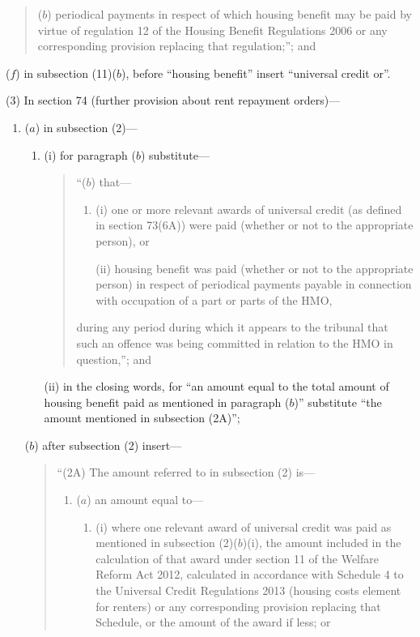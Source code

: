 \documentclass[12pt,a4paper]{article}
\begin{document}
\begin{enumerate}
\begin{enumerate}
\begin{quotation}
\begin{enumerate}
($b$) 
periodical payments in respect of which housing benefit may be paid by virtue of regulation 12 of the Housing Benefit Regulations 2006 or any corresponding provision replacing that regulation;”; and
\end{enumerate}
\end{quotation}
\end{enumerate}

($f$) in subsection (11)($b$), before “housing benefit” insert “universal credit or”.
\end{enumerate}

(3) In section 74 (further provision about rent repayment orders)—
\begin{enumerate}\item[]
($a$) in subsection (2)—
\begin{enumerate}\item[]
(i) for paragraph ($b$)  substitute—
\begin{quotation}
“($b$) that—
\begin{enumerate}\item[]
(i) one or more relevant awards of universal credit (as defined in section 73(6A)) were paid (whether or not to the appropriate person), or

(ii) housing benefit was paid (whether or not to the appropriate person) in respect of periodical payments payable in connection with occupation of a part or parts of the HMO,
\end{enumerate}
during any period during which it appears to the tribunal that such an offence was being committed in relation to the HMO in question,”; and
\end{quotation}

(ii) in the closing words, for “an amount equal to the total amount of housing benefit paid as mentioned in paragraph ($b$)” substitute “the amount mentioned in subsection (2A)”;
\end{enumerate}

($b$) after subsection (2) insert—
\begin{quotation}
“(2A) The amount referred to in subsection (2) is—
\begin{enumerate}\item[]
($a$) an amount equal to—
\begin{enumerate}\item[]
(i) where one relevant award of universal credit was paid as mentioned in subsection (2)($b$)(i), the amount included in the calculation of that award under section 11 of the Welfare Reform Act 2012, calculated in accordance with Schedule 4 to the Universal Credit Regulations 2013 (housing costs element for renters) or any corresponding provision replacing that Schedule, or the amount of the award if less; or


\end{enumerate}
\end{enumerate}
\end{quotation}
\end{enumerate}
\end{document}
